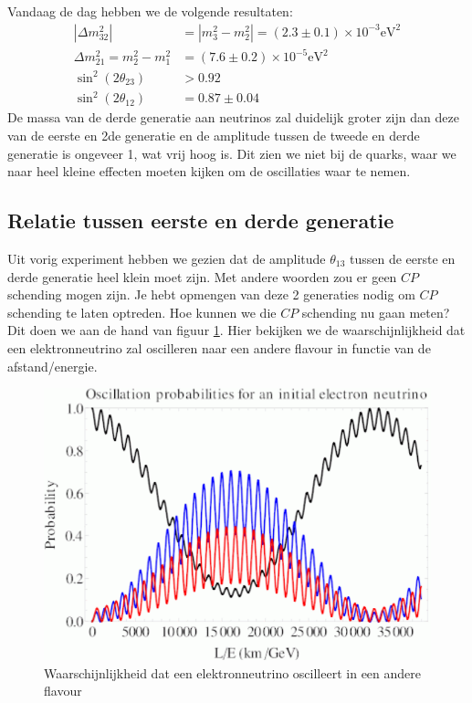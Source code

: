 \documentclass[../main.tex]{subfiles}
\begin{document}
Vandaag de dag hebben we de volgende resultaten:
\begin{equation}
    \begin{aligned}
        \label{eq:neutrino_osc_waarden_vervolg}
        \left|\Delta m_{32}^{2}\right|&=\left|m_{3}^{2}-m_{2}^{2}\right|=(2.3 \pm 0.1) \times 10^{-3} \mathrm{eV}^{2} \\
        \Delta m_{21}^{2}=m_{2}^{2}-m_{1}^{2}&=(7.6 \pm 0.2) \times 10^{-5} \mathrm{eV}^{2} \\
        \sin ^{2}\left(2 \theta_{23}\right)&>0.92 \\
        \sin ^{2}\left(2 \theta_{12}\right)&=0.87 \pm 0.04
    \end{aligned}
\end{equation}
De massa van de derde generatie aan neutrinos zal duidelijk groter zijn dan deze van de eerste en 2de generatie en de amplitude tussen de tweede en derde generatie is ongeveer 1, wat vrij hoog is. Dit zien we niet bij de quarks, waar we naar heel kleine effecten moeten kijken om de oscillaties waar te nemen.

\subsection{Relatie tussen eerste en derde generatie}%
\label{sub:relatie_tussen_eerste_en_derde_generatie}

Uit vorig experiment hebben we gezien dat de amplitude $\theta_{13}$ tussen de eerste en derde generatie heel klein moet zijn. Met andere woorden zou er geen $CP$ schending mogen zijn. Je hebt opmengen van deze 2 generaties nodig om $CP$ schending te laten optreden. Hoe kunnen we die $CP$ schending nu gaan meten? Dit doen we aan de hand van figuur \ref{fig:neutrinos/neutr_osc_waarschijnlijkheid}. Hier bekijken we de waarschijnlijkheid dat een elektronneutrino zal oscilleren naar een andere flavour in functie van de afstand/energie.

\begin{figure}[h]
    \centering
    \includegraphics[width=0.6\linewidth]{neutrinos/neutr_osc_waarschijnlijkheid.png}
    \caption{Waarschijnlijkheid dat een elektronneutrino oscilleert in een andere flavour}%
    \label{fig:neutrinos/neutr_osc_waarschijnlijkheid}
\end{figure}
\end{document}
